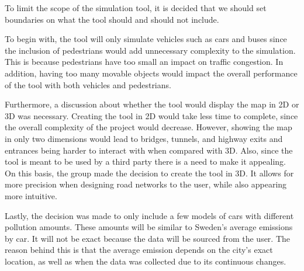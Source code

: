 
To limit the scope of the simulation tool, it is decided that we should set boundaries on what the tool should and should not include. 

To begin with, the tool will only simulate vehicles such as cars and buses since the inclusion of pedestrians would add unnecessary complexity to the simulation. This is because pedestrians have too small an impact on traffic congestion. In addition, having too many movable objects would impact the overall performance of the tool with both vehicles and pedestrians.

Furthermore, a discussion about whether the tool would display the map in 2D or 3D was necessary. Creating the tool in 2D would take less time to complete, since the overall complexity of the project would decrease. However, showing the map in only two dimensions would lead to bridges, tunnels, and highway exits and entrances being harder to interact with when compared with 3D. Also, since the tool is meant to be used by a third party there is a need to make it appealing. On this basis, the group made the decision to create the tool in 3D. It allows for more precision when designing road networks to the user, while also appearing more intuitive.

Lastly, the decision was made to only include a few models of cars with different pollution amounts. These amounts will be similar to Sweden's average emissions by car. It will not be exact because the data will be sourced from the user. The reason behind this is that the average emission depends on the city's exact location, as well as when the data was collected due to its continuous changes.